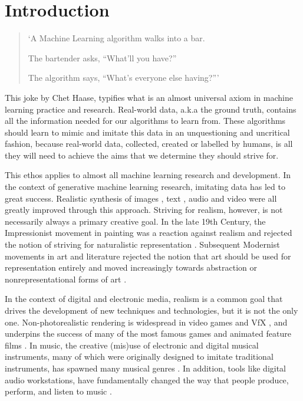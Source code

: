 \chapter{Introduction}
\label{ch:intro}

\begin{quote}

`A Machine Learning algorithm walks into a bar.

The bartender asks, ``What'll you have?''

The algorithm says, ``What's everyone else having?'''\citep{haase2017bar} 

\end{quote}

This joke by Chet Haase, typifies what is an almost universal axiom in machine learning practice and research. 
Real-world data, a.k.a the ground truth, contains all the information needed for our algorithms to learn from. 
These algorithms should learn to mimic and imitate this data in an unquestioning and uncritical fashion, because real-world data, collected, created or labelled by humans, is all they will need to achieve the aims that we determine they should strive for.

This ethos applies to almost all machine learning research and development. In the context of generative machine learning research, imitating data has led to great success. 
Realistic synthesis of images \citep{karras2019style}, text \citep{radford2018improving}, audio \citep{oord2016wavenet} and video \citep{openai2024sora} were all greatly improved through this approach. 
Striving for realism, however, is not necessarily always a primary creative goal.
In the late 19th Century, the Impressionist movement in painting was a reaction against realism and rejected the notion of striving for naturalistic representation \citep{venturi1941aesthetic}. 
Subsequent Modernist movements in art and literature rejected the notion that art should be used for representation entirely and moved increasingly towards abstraction or nonrepresentational forms of art \citep{lewis2007cambridge}.

In the context of digital and electronic media, realism is a common goal that drives the development of new techniques and technologies, but it is not the only one. 
Non-photorealistic rendering is widespread in video games and VfX \citep{strothotte2002non}, and underpins the success of many of the most famous games and animated feature films \citep{kyprianidis2012state}. 
In music, the creative (mis)use of electronic and digital musical instruments, many of which were originally designed to imitate traditional instruments, has spawned many musical genres \citep{mcglynn2017happy}. 
In addition, tools like digital audio workstations, have fundamentally changed the way that people produce, perform, and listen to music \citep{ashbourn2021use}.

